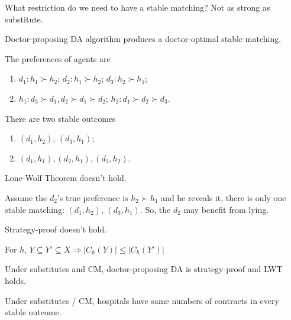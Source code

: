 \documentclass[11pt]{elegantbook}
\begin{document}
What restriction do we need to have a stable matching? Not as strong as substitute.

\begin{corollary}
    Doctor-proposing DA algorithm produces a doctor-optimal stable matching.
\end{corollary}

\begin{example} The preferences of agents are
    \begin{enumerate}[$\circ$]
        \item $d_1: h_1\succ h_2$; $d_2: h_1\succ h_2$; $d_3: h_2\succ h_1$;
        \item $h_1: d_3\succ d_1,d_2\succ d_1\succ d_2$; $h_2: d_1\succ d_2\succ d_3$.
    \end{enumerate}
    There are two stable outcomes
    \begin{enumerate}
        \item $(d_1,h_2)$, $(d_3,h_1)$;
        \item $(d_1,h_1), (d_2,h_1), (d_3,h_2)$.
    \end{enumerate}
    \begin{remark}
        Lone-Wolf Theorem doesn't hold.
    \end{remark}

    Assume the $d_2$'s true preference is $h_2\succ h_1$ and he reveals it, there is only one stable matching: $(d_1,h_2)$, $(d_3,h_1)$. So, the $d_2$ may benefit from lying.\\
    \begin{remark}
        Strategy-proof doesn't hold.
    \end{remark}
\end{example}

\begin{definition}
    \normalfont
    For $h$, $Y\subseteq Y'\subseteq X \Rightarrow |C_h(Y)|\leq |C_h(Y')|$
\end{definition}

\begin{theorem}
    Under substitutes and CM, doctor-proposing DA is strategy-proof and LWT holds.
\end{theorem}

\begin{theorem}
    Under substitutes / CM, hospitals have same numbers of contracts in every stable outcome.
\end{theorem}
\end{document}
